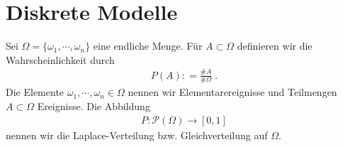 
\section{Diskrete Modelle}

\begin{Definition}

Sei $\Omega = \{ \omega_1, \cdots , \omega_n\}$ eine endliche Menge. Für $A \subset \Omega$ definieren wir die Wahrscheinlichkeit durch
\begin{align*}
P(A) : = \frac{\#A}{ \# \Omega} \; . 
\end{align*} 
Die Elemente $ \omega_1, \cdots , \omega_n \in \Omega$ nennen wir Elementarereignisse und Teilmengen $A \subset \Omega$ Ereignisse. Die Abbildung
\begin{align*}
P : \mathcal{P} (\Omega) \to [0,1]  
\end{align*}  
nennen wir die Laplace-Verteilung bzw. Gleichverteilung auf $\Omega$.
\end{Definition}

